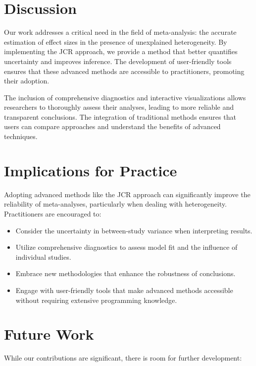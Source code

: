 \documentclass[12pt,a4paper]{report}
\begin{document}
\section{Discussion}
\label{sec:discussion_conclusion}

Our work addresses a critical need in the field of meta-analysis: the accurate estimation of effect sizes in the presence of unexplained heterogeneity. By implementing the JCR approach, we provide a method that better quantifies uncertainty and improves inference. The development of user-friendly tools ensures that these advanced methods are accessible to practitioners, promoting their adoption.

The inclusion of comprehensive diagnostics and interactive visualizations allows researchers to thoroughly assess their analyses, leading to more reliable and transparent conclusions. The integration of traditional methods ensures that users can compare approaches and understand the benefits of advanced techniques.

\section{Implications for Practice}
\label{sec:implications_practice}

Adopting advanced methods like the JCR approach can significantly improve the reliability of meta-analyses, particularly when dealing with heterogeneity. Practitioners are encouraged to:

\begin{itemize}
    \item Consider the uncertainty in between-study variance when interpreting results.
    \item Utilize comprehensive diagnostics to assess model fit and the influence of individual studies.
    \item Embrace new methodologies that enhance the robustness of conclusions.
    \item Engage with user-friendly tools that make advanced methods accessible without requiring extensive programming knowledge.
\end{itemize}

\section{Future Work}
\label{sec:future_work}

While our contributions are significant, there is room for further development:
\end{document}

